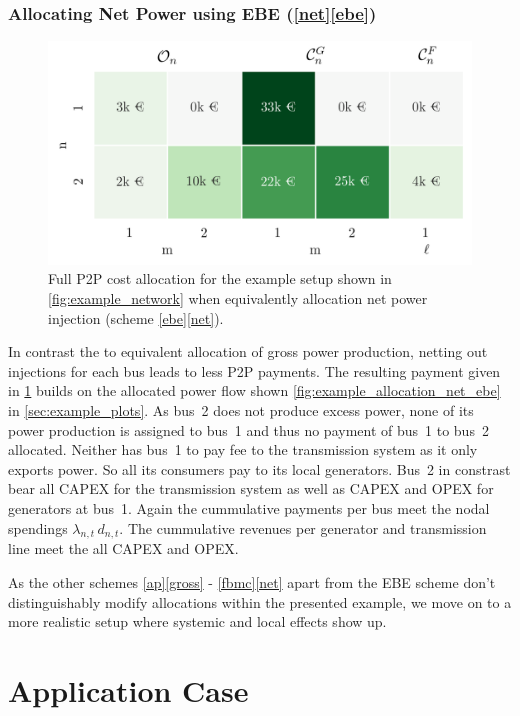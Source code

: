 \documentclass[11pt,twocolumn]{article}
\newcommand{\lmp}[1][n]{\lambda_{#1,t}}
\newcommand{\demand}[1][n]{d_{#1,t}}
\begin{document}
\subsubsection*{Allocating Net Power using EBE (\ref{net}\ref{ebe}) }

\begin{figure}[h!]
    \centering
    \includegraphics[width=\linewidth]{example_payoff_net_ebe.png}
    \caption{Full P2P cost allocation for the example setup shown in \cref{fig:example_network} when equivalently allocation net power injection (scheme \ref{ebe}\ref{net}).}
    \label{fig:example_payoff_net_ebe}
    \end{figure}    
% 
In contrast the to equivalent allocation of gross power production, netting out injections for each bus leads to less P2P payments. The resulting payment given in \cref{fig:example_payoff_net_ebe} builds on the allocated power flow shown \cref{fig:example_allocation_net_ebe} in \cref{sec:example_plots}. As bus~2 does not produce excess power, none of its power production is assigned to bus~1 and thus no payment of bus~1 to bus~2 allocated. Neither has bus~1 to pay fee to the transmission system as it only exports power. So all its consumers pay to its local generators. Bus~2 in constrast bear all CAPEX for the transmission system as well as CAPEX and OPEX for generators at bus~1.
% 
Again the cummulative payments per bus meet the nodal spendings $\lmp \, \demand$. The cummulative revenues per generator and transmission line meet the all CAPEX and OPEX.  

As the other schemes \ref{ap}\ref{gross} - \ref{fbmc}\ref{net} apart from the EBE scheme don't distinguishably modify allocations within the presented example, we move on to a more realistic setup where systemic and local effects show up.


\section{Application Case}
\end{document}
